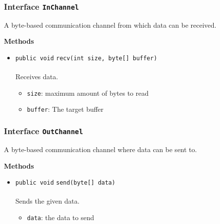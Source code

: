 \subsubsection{Interface \lstinline|InChannel|}
A byte-based communication channel from which data can be received. \\
\noindent\begin{minipage}[t]{5cm}
\vspace{0.3em}
\hspace*{2em}
\vspace{0.3em}
\end{minipage}





\textbf{\sffamily Methods}
\begin{itemize}
\item \lstinline|public void| \lstinline|recv|\lstinline|(int size, byte[] buffer)|\\ \\[-0.6em]
Receives data.
\begin{itemize}
\item \lstinline|size|: maximum amount of bytes to read
\item \lstinline|buffer|: The target buffer
\end{itemize}



\end{itemize}

\subsubsection{Interface \lstinline|OutChannel|}
A byte-based communication channel where data can be sent to. \\
\noindent\begin{minipage}[t]{5cm}
\vspace{0.3em}
\hspace*{2em}
\vspace{0.3em}
\end{minipage}





\textbf{\sffamily Methods}
\begin{itemize}
\item \lstinline|public void| \lstinline|send|\lstinline|(byte[] data)|\\ \\[-0.6em]
Sends the given data.
\begin{itemize}
\item \lstinline|data|: the data to send
\end{itemize}



\end{itemize}


